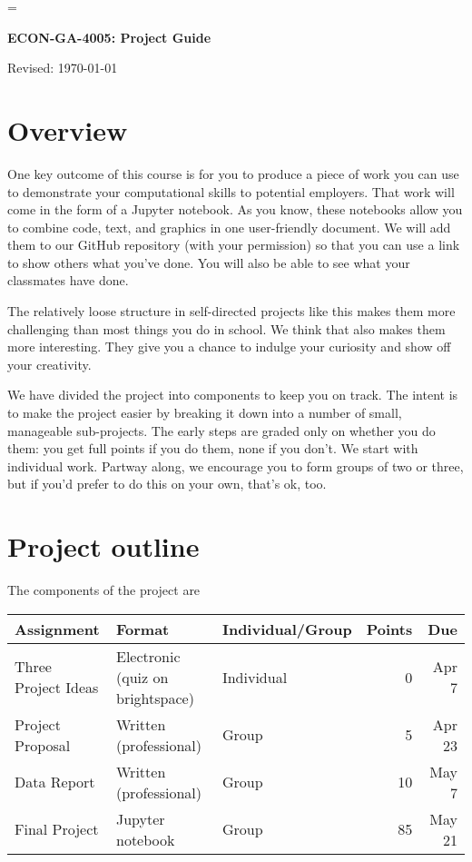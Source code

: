 \documentclass[11pt]{article}
\begin{document}
\parskip=\bigskipamount
\parindent=0.0in
\thispagestyle{empty}


\bigskip\bigskip
\centerline{\Large \bf ECON-GA-4005:  Project Guide}
\centerline{Revised: \today}

\section*{Overview}

One key outcome of this course is for you to produce a piece of work you can use
to demonstrate your computational skills to potential employers. That work will
come in the form of a Jupyter notebook. As you know, these notebooks allow you
to combine code, text, and graphics in one user-friendly document. We will add
them to our GitHub repository (with your permission) so that you can use a link
to show others what you've done. You will also be able to see what your
classmates have done.

The relatively loose structure in self-directed projects like this makes them
more challenging than most things you do in school. We think that also makes
them more interesting. They give you a chance to indulge your curiosity and show
off your creativity.

We have divided the project into components to keep you on track. The intent is
to make the project easier by breaking it down into a number of small,
manageable sub-projects. The early steps are graded only on whether you do them:
you get full points if you do them, none if you don't. We start with individual
work.  Partway along, we encourage you to form groups of two or three, but if
you'd prefer to do this on your own, that's ok, too.


\section*{Project outline}

The components of the project are
%
\begin{center}
      \begin{tabular}{lllrr}
            \toprule
            Assignment          & Format                           & Individual/Group & Points & Due    \\
            \midrule
            Three Project Ideas & Electronic (quiz on brightspace) & Individual       & 0      & Apr 7  \\
            Project Proposal    & Written (professional)           & Group            & 5      & Apr 23 \\
            Data Report         & Written (professional)           & Group            & 10     & May 7  \\
            Final Project       & Jupyter notebook                 & Group            & 85     & May 21 \\
            \bottomrule
      \end{tabular}
\end{center}
\end{document}
